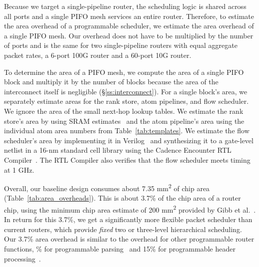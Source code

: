 Because we target a single-pipeline router, the scheduling logic is shared
across all ports and a single PIFO mesh services an entire router.  Therefore,
to estimate the area overhead of a programmable scheduler, we estimate the area
overhead of a single PIFO mesh. Our overhead does not have to be multiplied by
the number of ports and is the same for two single-pipeline routers with equal
aggregate packet rates, \eg a 6-port 100G router and a 60-port 10G router.

To determine the area of a PIFO mesh, we compute the area of a single PIFO
block and multiply it by the number of blocks because the area of the
interconnect itself is negligible (\S\ref{ss:interconnect}).  For a single
block's area, we separately estimate areas for the rank store, atom pipelines,
and flow scheduler. We ignore the area of the small next-hop lookup tables.  We
estimate the rank store's area by using SRAM estimates~\cite{sram_estimate} and
the atom pipeline's area using the individual atom area numbers from
Table~\ref{tab:templates}. We estimate the flow scheduler's area by
implementing it in Verilog~\cite{system_verilog} and synthesizing it to a
gate-level netlist in a 16-nm standard cell library using the Cadence Encounter
RTL Compiler~\cite{cadence_rc}. The RTL Compiler also verifies that the flow
scheduler meets timing at 1 GHz.

Overall, our baseline design consumes about 7.35 \si{\milli\metre\squared} of
chip area (Table~\ref{tab:area_overheads}). This is about 3.7\% of the chip
area of a router chip, using the minimum chip area estimate of 200
\si{\milli\metre\squared} provided by Gibb et al.~\cite{glen_parsing}. In
return for this 3.7\%, we get a significantly more flexible packet scheduler
than current routers, which provide {\em fixed} two or three-level hierarchical
scheduling. Our 3.7\% area overhead is similar to the overhead for other
programmable router functions, \% for programmable
parsing~\cite{glen_parsing} and 15\% for programmable header
processing~\cite{rmt}.
 
